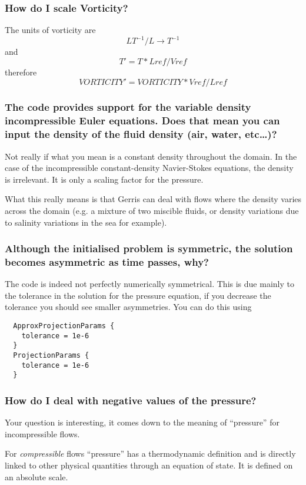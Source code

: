 \documentclass[a4paper]{article}
\begin{document}
\subsubsection{How do I scale Vorticity?}

The units of vorticity are 
$$LT^{-1}/L \rightarrow T^{-1}$$
and
$$ T' = T*Lref/Vref$$
therefore
$$
VORTICITY' = VORTICITY*Vref/Lref
$$

\subsubsection{The code provides support for the variable density incompressible Euler 
equations.  Does that mean you can input the density of the fluid density 
(air, water, etc\dots)?}

Not really if what you mean is a constant density throughout the
domain. In the case of the incompressible constant-density Navier-Stokes
equations, the density is irrelevant. It is only a scaling factor for
the pressure.

What this really means is that Gerris can deal with flows where
the density varies across the domain (e.g. a mixture of two miscible
fluids, or density variations due to salinity variations in the sea for
example).

\subsubsection{Although the initialised problem is symmetric, the solution 
becomes asymmetric as time passes, why?}

The code is indeed not perfectly numerically symmetrical. This is due
mainly to the tolerance in the solution for the pressure equation, if
you decrease the tolerance you should see smaller
asymmetries. You can do this using
\begin{verbatim}
  ApproxProjectionParams {
    tolerance = 1e-6
  }
  ProjectionParams {
    tolerance = 1e-6
  }
\end{verbatim}

\subsubsection{How do I deal with negative values of the pressure?}

Your question is interesting, it comes down to the meaning of
``pressure'' for incompressible flows.

For {\em compressible} flows ``pressure'' has a thermodynamic definition
and is directly linked to other physical quantities through an
equation of state. It is defined on an absolute scale.
\end{document}
